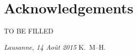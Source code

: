 \chapter*{Acknowledgements}
TO BE FILLED

\bigskip
 
\noindent\textit{Lausanne, 14 Ao\^{u}t 2015}
\hfill K.~M--H.
